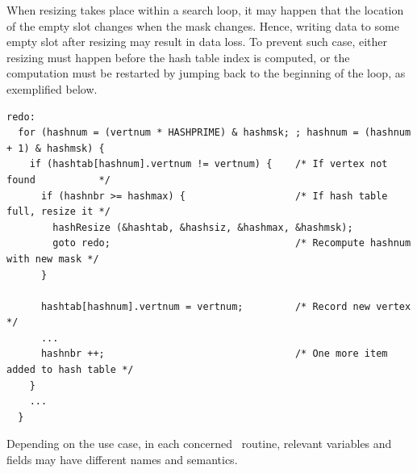 When resizing takes place within a search loop, it may happen that the
location of the empty slot changes when the mask changes. Hence,
writing data to some empty slot after resizing may result in data
loss. To prevent such case, either resizing must happen before the
hash table index is computed, or the computation must be restarted by
jumping back to the beginning of the loop, as exemplified below.

\begin{lstlisting}[style=language-c]
redo:
  for (hashnum = (vertnum * HASHPRIME) & hashmsk; ; hashnum = (hashnum + 1) & hashmsk) {
    if (hashtab[hashnum].vertnum != vertnum) {    /* If vertex not found           */
      if (hashnbr >= hashmax) {                   /* If hash table full, resize it */
        hashResize (&hashtab, &hashsiz, &hashmax, &hashmsk);
        goto redo;                                /* Recompute hashnum with new mask */
      }

      hashtab[hashnum].vertnum = vertnum;         /* Record new vertex */
      ...
      hashnbr ++;                                 /* One more item added to hash table */
    }
    ...
  }
\end{lstlisting}

Depending on the use case, in each concerned \scotch\ routine,
relevant variables and fields may have different names and semantics.

